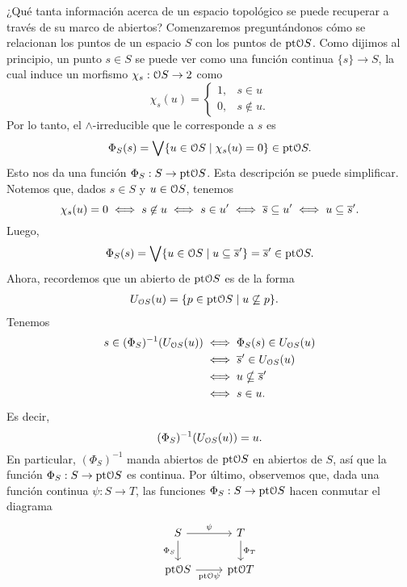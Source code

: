 \documentclass{comunicaciones}
\begin{document}
¿Qué tanta información acerca de un espacio topológico se
puede recuperar a través de su marco de abiertos?
Comenzaremos preguntándonos
cómo se relacionan los puntos de un espacio $S$ con los puntos de
$\mathrm{pt}\mathcal{O}S$.
Como dijimos al principio, un punto $s\in S$ se puede ver como una
función continua $\{s\}\to S$, la cual induce un morfismo
$\chi_s:\mathcal{O} S \to 2$ como
\begin{equation}
  \chi_s(u) =
  \begin{cases}
    1, & s\in u  \\
    0, & s\not\in u.
  \end{cases}
\end{equation}
Por lo tanto, el $\wedge$-irreducible que le corresponde a $s$ es
\begin{equation}
  \Phi_S(s) = \bigvee\{u\in\mathcal{O}S\mid \chi_s(u)=0\} \in \mathrm{pt}\mathcal{O} S
  .\end{equation}
Esto nos da una función $\Phi_S:S\to\mathrm{pt}\mathcal{O}S$. Esta descripción
se puede simplificar. Notemos que, dados $s\in S$ y $u\in\mathcal{O}S$, tenemos
\[
  \chi_s(u) = 0
  \iff
  s\not\in u
  \iff
  s\in u'
  \iff
  \overline{s} \subseteq u'
  \iff
  u \subseteq {\overline{s}}'.
\]
Luego,
\begin{equation}
  \Phi_S(s)
  =
  \bigvee\{u\in\mathcal{O}S\mid u\subseteq {\overline{s}}'\}
  =
  {\overline{s}}'
  \in
  \mathrm{pt}\mathcal{O}S
.\end{equation}
Ahora, recordemos que un abierto de $\mathrm{pt}\mathcal{O}S$ es de la forma
\begin{align*}
  U_{\mathcal{O}S}(u)
  &= \{p\in\mathrm{pt}\mathcal{O}S \mid u\not\subseteq p\}
.\end{align*}
Tenemos
\begin{align*}
    s\in (\Phi_S)^{-1}(U_{\mathcal{O}S}(u))
    &\iff \Phi_S(s) \in U_{\mathcal{O}S}(u) \\
    &\iff {\overline{s}}' \in U_{\mathcal{O}S}(u) \\
    &\iff u \nsubseteq {\overline{s}}' \\
    &\iff s\in u.
\end{align*}
Es decir,
\[
  (\Phi_S)^{-1}(U_{\mathcal{O}S}(u)) = u
.\]
En particular, $(\Phi_S)^{-1}$ manda abiertos de $\mathrm{pt}\mathcal{O}S$ en
abiertos de $S$, así que la función $\Phi_S:S\to\mathrm{pt}\mathcal{O}S$ es continua.
Por último, observemos que, dada una función continua $\psi:S\to T$,
las funciones $\Phi_S:S\to\mathrm{pt}\mathcal{O}S$ hacen conmutar el diagrama
\[
    \begin{tikzcd}
        S \ar[r,"\psi"] \ar[d,"\Phi_S"'] & T \ar[d,"\Phi_T"] \\
        \pt\Cal OS \ar[r,"\pt\Cal O\psi"'] & \pt\Cal OT
    \end{tikzcd}
\]
\end{document}

